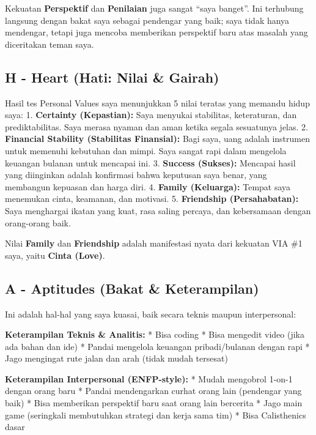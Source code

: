 \documentclass[
  letterpaper,
  DIV=11,
  numbers=noendperiod]{scrreprt}
\begin{document}
Kekuatan \textbf{Perspektif} dan \textbf{Penilaian} juga sangat ``saya
banget''. Ini terhubung langsung dengan bakat saya sebagai pendengar
yang baik; saya tidak hanya mendengar, tetapi juga mencoba memberikan
perspektif baru atas masalah yang diceritakan teman saya.

\subsection{H - Heart (Hati: Nilai \&
Gairah)}\label{h---heart-hati-nilai-gairah}

Hasil tes Personal Values saya menunjukkan 5 nilai teratas yang memandu
hidup saya: \textbar{} 1. \textbf{Certainty (Kepastian):} Saya menyukai
stabilitas, keteraturan, dan prediktabilitas. Saya merasa nyaman dan
aman ketika segala sesuatunya jelas. \textbar{} 2. \textbf{Financial
Stability (Stabilitas Finansial):} Bagi saya, uang adalah instrumen
untuk memenuhi kebutuhan dan mimpi. Saya sangat rapi dalam mengelola
keuangan bulanan untuk mencapai ini. \textbar{} 3. \textbf{Success
(Sukses):} Mencapai hasil yang diinginkan adalah konfirmasi bahwa
keputusan saya benar, yang membangun kepuasan dan harga diri. \textbar{}
4. \textbf{Family (Keluarga):} Tempat saya menemukan cinta, keamanan,
dan motivasi. \textbar{} 5. \textbf{Friendship (Persahabatan):} Saya
menghargai ikatan yang kuat, rasa saling percaya, dan kebersamaan dengan
orang-orang baik.

Nilai \textbf{Family} dan \textbf{Friendship} adalah manifestasi nyata
dari kekuatan VIA \#1 saya, yaitu \textbf{Cinta (Love)}.

\subsection{A - Aptitudes (Bakat \&
Keterampilan)}\label{a---aptitudes-bakat-keterampilan}

Ini adalah hal-hal yang saya kuasai, baik secara teknis maupun
interpersonal:

\textbf{Keterampilan Teknis \& Analitis:} \textbar{} * Bisa coding
\textbar{} * Bisa mengedit video (jika ada bahan dan ide) \textbar{} *
Pandai mengelola keuangan pribadi/bulanan dengan rapi \textbar{} * Jago
mengingat rute jalan dan arah (tidak mudah tersesat)

\textbf{Keterampilan Interpersonal (ENFP-style):} \textbar{} * Mudah
mengobrol 1-on-1 dengan orang baru \textbar{} * Pandai mendengarkan
curhat orang lain (pendengar yang baik) \textbar{} * Bisa memberikan
perspektif baru saat orang lain bercerita \textbar{} * Jago main game
(seringkali membutuhkan strategi dan kerja sama tim) \textbar{} * Bisa
Calisthenics dasar
\end{document}
